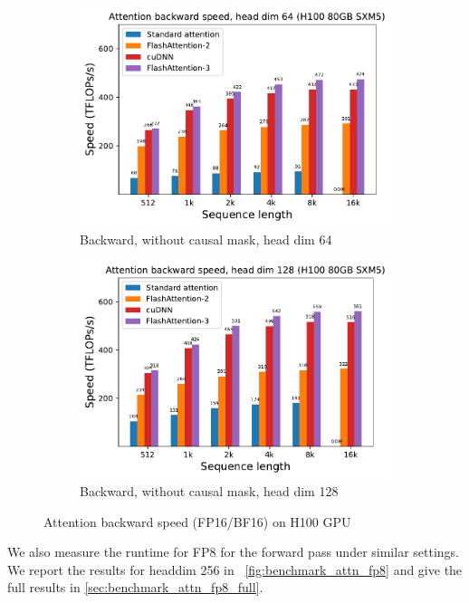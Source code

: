\begin{figure}[ht]
  \centering
  \begin{subfigure}{.5\textwidth}
    \centering
    \includegraphics[width=.95\linewidth]{figs/flash3_h100_causal_False_hdim_64_bwd_speed.pdf}
    \caption{Backward, without causal mask, head dim 64}
  \end{subfigure}%
  \begin{subfigure}{.5\textwidth}
    \centering
    \includegraphics[width=.95\linewidth]{figs/flash3_h100_causal_False_hdim_128_bwd_speed.pdf}
    \caption{Backward, without causal mask, head dim 128}
  \end{subfigure}
  \caption{Attention backward speed (FP16/BF16) on H100 GPU}
  \label{fig:benchmark_attn_bwd}

\end{figure}

We also measure the runtime for FP8 for the forward pass under similar settings.
We report the results for headdim 256 in ~\cref{fig:benchmark_attn_fp8} and give the full results in \cref{sec:benchmark_attn_fp8_full}.

